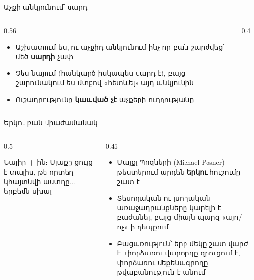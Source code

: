 \begin{frame}{Աչքի անկյունում՝ սարդ}
  \begin{columns}[c]
    \begin{column}{0.56\textwidth}
      \begin{itemize}
        \item Աշխատում ես, ու աչքիդ անկյունում ինչ-որ բան շարժվեց՝ մեծ \textbf{սարդի} չափ
        \item<2-> Չես նայում (հանկարծ իսկապես սարդ է), բայց շարունակում ես մտքով «հետևել» այդ անկյունին
        \item<3-> Ուշադրությունը \textbf{կապված չէ} աչքերի ուղղությանը
      \end{itemize}
    \end{column}
    \begin{column}{0.4\textwidth}
      \centering
      \ \par\medskip
    \end{column}
  \end{columns}
\end{frame}

\begin{frame}{Երկու բան միաժամանակ}
  \begin{columns}[c]
    \begin{column}{0.5\textwidth}
      \centering
      \par\smallskip
      {\small Նայիր \textbf{+}-ին։ Սլաքը ցույց է տալիս, թե որտեղ կհայտնվի աստղը... երբեմն սխալ}
    \end{column}
    \begin{column}{0.46\textwidth}
      \begin{itemize}
        \item<4-> Մայքլ Պոզների (Michael Posner) թեստերում արդեն \textbf{երկու} հուշումը շատ է
        \item<5-> Տեսողական ու լսողական առաջադրանքները կարելի է բաժանել, բայց միայն պարզ «այո/ոչ»-ի դեպքում
        \item<6-> Բացառություն՝ երբ մեկը շատ վարժ է. փորձառու վարորդը զրուցում է, փորձառու մեքենագրողը թվաբանություն է անում
      \end{itemize}
    \end{column}
  \end{columns}
\end{frame}

